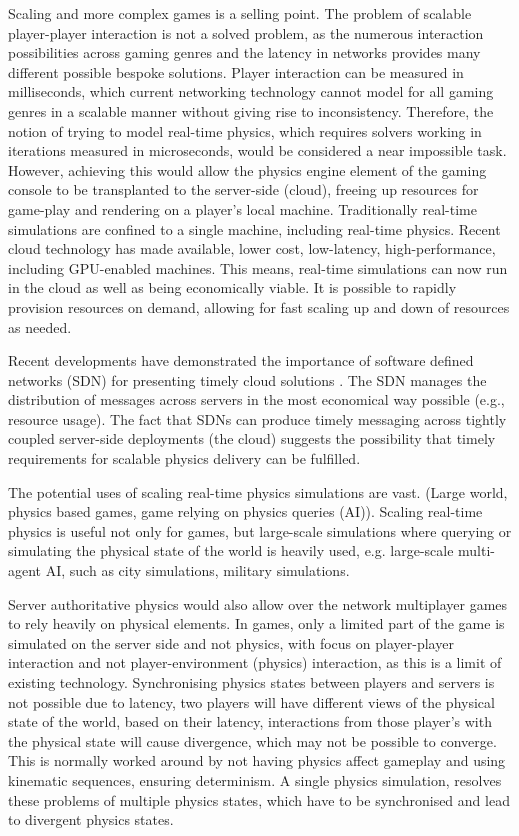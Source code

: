 Scaling and more complex games is a selling point.
The problem of scalable player-player interaction is not a solved problem, as the numerous interaction possibilities across gaming genres and the latency in networks provides many different possible bespoke solutions. Player interaction can be measured in milliseconds, which current networking technology cannot model for all gaming genres in a scalable manner without giving rise to inconsistency. Therefore, the notion of trying to model real-time physics, which requires solvers working in iterations measured in microseconds, would be considered a near impossible task. However, achieving this would allow the physics engine element of the gaming console to be transplanted to the server-side (cloud), freeing up resources for game-play and rendering on a player's local machine.
Traditionally real-time simulations are confined to a single machine, including real-time physics. 
Recent cloud technology has made available, lower cost, low-latency, high-performance, including GPU-enabled machines. This means, real-time simulations can now run in the cloud as well as being economically viable. It is possible to rapidly provision resources on demand, allowing for fast scaling up and down of resources as needed.

Recent developments have demonstrated the importance of software defined networks (SDN) for presenting timely cloud solutions \cite{Wang, Kumar}. The SDN manages the distribution of messages across servers in the most economical way possible (e.g., resource usage). The fact that SDNs can produce timely messaging across tightly coupled server-side deployments (the cloud) suggests the possibility that timely requirements for scalable physics delivery can be fulfilled.

The potential uses of scaling real-time physics simulations are vast. (Large world, physics based games, game relying on physics queries (AI)). Scaling real-time physics is useful not only for games, but large-scale simulations where querying or simulating the physical state of the world is heavily used, e.g. large-scale multi-agent AI, such as city simulations, military simulations. 

Server authoritative physics would also allow over the network multiplayer games to rely heavily on physical elements. In games, only a limited part of the game is simulated on the server side and not physics, with focus on player-player interaction and not player-environment (physics) interaction, as this is a limit of existing technology. 
Synchronising physics states between players and servers is not possible due to latency, two players will have different views of the physical state of the world, based on their latency, interactions from those player's with the physical state will cause divergence, which may not be possible to converge. This is normally worked around by not having physics affect gameplay and using kinematic sequences, ensuring determinism. A single physics simulation, resolves these problems of multiple physics states, which have to be synchronised and lead to divergent physics states. 

